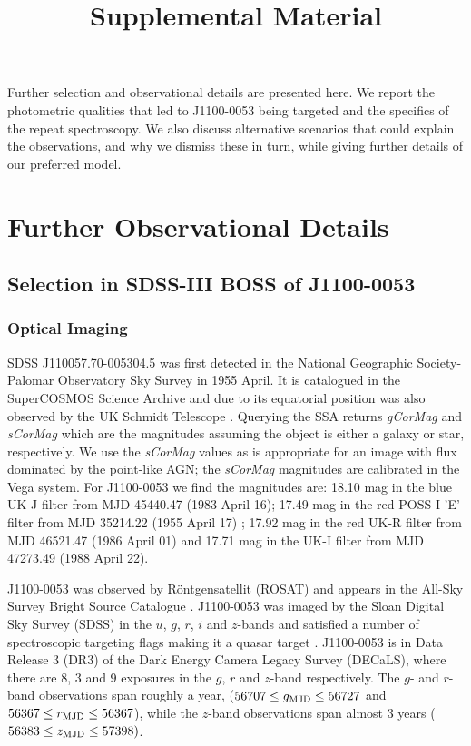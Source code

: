 \documentclass[11pt,a4paper]{article}
\begin{document}
   \title{Supplemental Material}
\maketitle

Further selection and observational details are presented here. We
report the photometric qualities that led to J1100-0053 being
targeted and the specifics of the repeat spectroscopy. We also
discuss alternative scenarios that could explain the observations, and
why we dismiss these in turn, while giving further details of our
preferred model.


\section{Further Observational Details}

\subsection{Selection in SDSS-III BOSS of J1100-0053}

\subsubsection{Optical Imaging}
SDSS J110057.70-005304.5 was first detected in the National Geographic
Society-Palomar Observatory Sky Survey \cite[NGS-POSS; ][]{Abell1959,
Minkowski_Abell1963book} in 1955 April. It is catalogued in the
SuperCOSMOS Science Archive \cite[\href{http://ssa.roe.ac.uk/}{SSA};
][]{Hambly2001_I, Hambly2001_II} and due to its equatorial position
was also observed by the UK Schmidt Telescope \cite[UKST;
][]{Cannon1975, Cannon1979book}. Querying the SSA returns {\it
gCorMag} and {\it sCorMag} which are the magnitudes assuming the
object is either a galaxy or star, respectively. We use the {\it
sCorMag} values as is appropriate for an image with flux dominated by
the point-like AGN; the {\it sCorMag} magnitudes are calibrated in the
Vega system. For J1100-0053 we find the magnitudes are: 18.10 mag in
the blue UK-J filter from MJD 45440.47 (1983 April 16); 17.49 mag in
the red POSS-I 'E'-filter from MJD 35214.22 (1955 April 17) ; 17.92
mag in the red UK-R filter from MJD 46521.47 (1986 April 01) and 17.71
mag in the UK-I filter from MJD 47273.49 (1988 April 22).

J1100-0053 was observed by R\"{o}ntgensatellit (ROSAT) and
appears in the All-Sky Survey Bright Source Catalogue \citep[RASS-BSC;
][]{Appenzeller1998, Voges1999}.  J1100-0053 was imaged by the
Sloan Digital Sky Survey (SDSS) in the $u$, $g$, $r$, $i$ and
$z$-bands and satisfied a number of spectroscopic targeting flags
making it a quasar target \citep{Richards2002}.  J1100-0053 is in Data
Release 3 (DR3) of the Dark Energy Camera Legacy Survey (DECaLS),
where there are 8, 3 and 9 exposures in the $g$, $r$ and $z$-band
respectively. The $g$- and $r$-band observations span roughly a year,
($56707 \leq g_{\rm MJD} \leq 56727$ and $56367 \leq r_{\rm MJD} \leq
56367$), while the $z$-band observations span almost 3 years ($56383
\leq z_{\rm MJD} \leq 57398)$.
\end{document}
